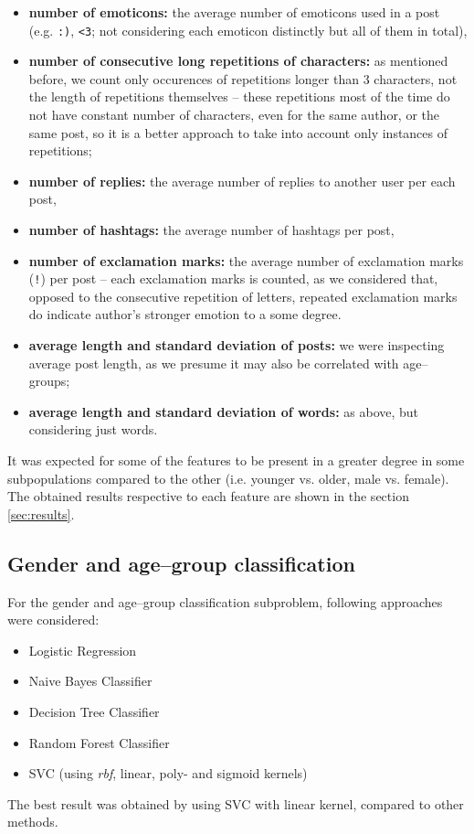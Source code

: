 \documentclass[10pt, a4paper]{article}
\begin{document}
\begin{itemize}
	\item \textbf{number of emoticons:} the average number of emoticons used in a post (e.g. \verb|:)|, \verb|<3|; not considering each emoticon distinctly but all of them in total),
	\item \textbf{number of consecutive long repetitions of characters:} as mentioned before, we count only occurences of repetitions longer than 3 characters, not the length of repetitions themselves -- these repetitions most of the time do not have constant number of characters, even for the same author, or the same post, so it is a better approach to take into account only instances of repetitions;
	\item \textbf{number of replies:} the average number of replies to another user per each post,
	\item \textbf{number of hashtags:} the average number of hashtags per post,
	\item \textbf{number of exclamation marks:} the average number of exclamation marks (\verb|!|) per post -- each exclamation marks is counted, as we considered that, opposed to the consecutive repetition of letters, repeated exclamation marks do indicate author's stronger emotion to a some degree.
	\item \textbf{average length and standard deviation of posts:} we were inspecting average post length, as we presume it may also be correlated with age--groups;
	\item \textbf{average length and standard deviation of words:} as above, but considering just words.
\end{itemize}

It was expected for some of the features to be present in a greater degree in some subpopulations compared to the other (i.e. younger vs. older, male vs. female).
The obtained results respective to each feature are shown in the section \ref{sec:results}.

\subsection{Gender and age--group classification}

For the gender and age--group classification subproblem, following approaches were considered:
\begin{itemize}
	\item Logistic Regression
	\item Naive Bayes Classifier
	\item Decision Tree Classifier
	\item Random Forest Classifier
	\item SVC (using \textit{rbf}, linear, poly- and sigmoid kernels)
\end{itemize}
\noindent The best result was obtained by using SVC with linear kernel, compared to other methods.
\end{document}
